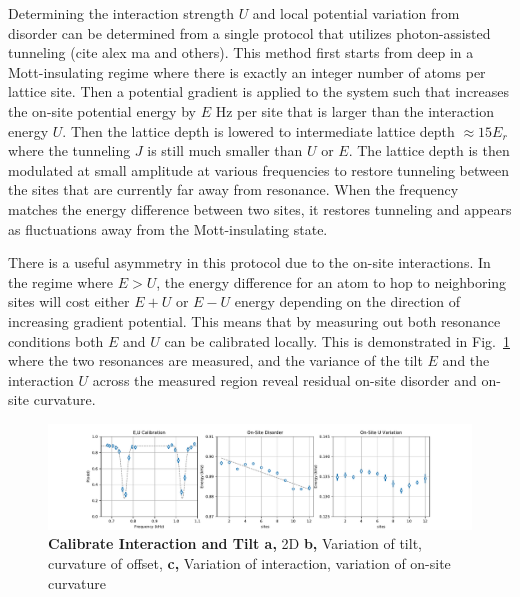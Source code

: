 Determining the interaction strength $U$ and local potential variation from disorder can be determined from a single protocol that utilizes photon-assisted tunneling (cite alex ma and others). This method first starts from deep in a Mott-insulating regime where there is exactly an integer number of atoms per lattice site. Then a potential gradient is applied to the system such that increases the on-site potential energy by $E$ Hz per site that is larger than the interaction energy $U$. Then the lattice depth is lowered to  intermediate lattice depth $\approx 15 E_r$ where the tunneling $J$ is still much smaller than $U$ or $E$. The lattice depth is then modulated at small amplitude at various frequencies to restore tunneling between the sites that are currently far away from resonance. When the frequency matches the energy difference between two sites, it restores tunneling and appears as fluctuations away from the Mott-insulating state.

There is a useful asymmetry in this protocol due to the on-site interactions. In the regime where $E>U$, the energy difference for an atom to hop to neighboring sites will cost either $E+U$ or $E-U$ energy depending on the direction of increasing gradient potential. This means that by measuring out both resonance conditions both $E$ and $U$ can be calibrated locally.  This is demonstrated in Fig.~\ref{fig:EUCal} where the two resonances are measured, and the variance of the tilt $E$ and the interaction $U$ across the measured region reveal residual on-site disorder and on-site curvature. 

\begin{figure}[h!]
		\includegraphics[width=\columnwidth]{figures/ch2/E_U_cal/EUCal.pdf} 
		\caption{\textbf{Calibrate Interaction and Tilt a,}  2D \textbf{b,} Variation of tilt, curvature of offset, \textbf{c,} Variation of interaction, variation of on-site curvature }
		\label{fig:EUCal}	
\end{figure}


